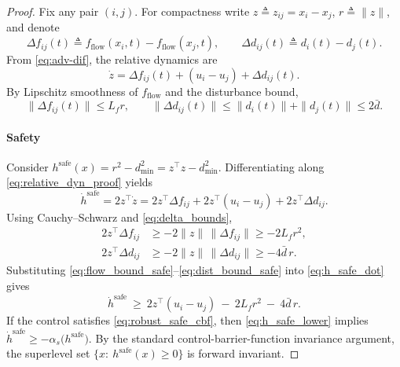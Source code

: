 \begin{proof}
Fix any pair $(i,j)$. For compactness write $z \triangleq z_{ij}=x_i-x_j$, $r\triangleq \|z\|$, and denote
\[
\Delta f_{ij}(t)\triangleq f_{\text{flow}}(x_i,t)-f_{\text{flow}}(x_j,t),\qquad
\Delta d_{ij}(t)\triangleq d_i(t)-d_j(t).
\]
From \eqref{eq:adv-dif}, the relative dynamics are
\begin{equation}
\dot z = \Delta f_{ij}(t) + (u_i-u_j) + \Delta d_{ij}(t).
\label{eq:relative_dyn_proof}
\end{equation}
By Lipschitz smoothness of $f_{\text{flow}}$ and the disturbance bound,
\begin{equation}
\|\Delta f_{ij}(t)\|\le L_f r,\qquad
\|\Delta d_{ij}(t)\|\le \|d_i(t)\|+\|d_j(t)\|\le 2\bar d.
\label{eq:delta_bounds}
\end{equation}

\paragraph{Safety}
Consider $h^{\mathrm{safe}}(x)=r^2-d_{\min}^2=z^\top z-d_{\min}^2$. Differentiating along \eqref{eq:relative_dyn_proof} yields
\begin{equation}
\dot h^{\mathrm{safe}}
= 2 z^\top \dot z
= 2 z^\top \Delta f_{ij} + 2 z^\top (u_i-u_j) + 2 z^\top \Delta d_{ij}.
\label{eq:h_safe_dot}
\end{equation}
Using Cauchy--Schwarz and \eqref{eq:delta_bounds},
\begin{align}
2 z^\top \Delta f_{ij}
&\ge -2\|z\|\,\|\Delta f_{ij}\|\ge -2L_f r^2,
\label{eq:flow_bound_safe}\\
2 z^\top \Delta d_{ij}
&\ge -2\|z\|\,\|\Delta d_{ij}\|\ge -4\bar d\, r.
\label{eq:dist_bound_safe}
\end{align}
Substituting \eqref{eq:flow_bound_safe}--\eqref{eq:dist_bound_safe} into \eqref{eq:h_safe_dot} gives
\begin{equation}
\dot h^{\mathrm{safe}}
\ \ge\
2 z^\top (u_i-u_j)\ -\ 2L_f r^2\ -\ 4\bar d\, r.
\label{eq:h_safe_lower}
\end{equation}
If the control satisfies \eqref{eq:robust_safe_cbf}, then \eqref{eq:h_safe_lower} implies
$\dot h^{\mathrm{safe}} \ge -\alpha_s\big(h^{\mathrm{safe}}\big)$.
By the standard control-barrier-function invariance argument, the superlevel set
$\{x:\ h^{\mathrm{safe}}(x)\ge 0\}$ is forward invariant.


\end{proof}
